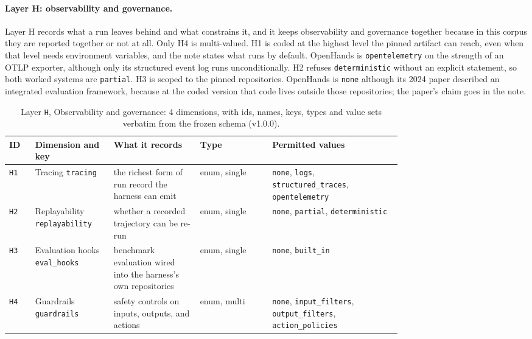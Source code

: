 \paragraph{Layer H: observability and governance.}\label{subsec:layer-h}
Layer H records what a run leaves behind and what constrains it, and it keeps observability and
governance together because in this corpus they are reported together or not at all. Only H4 is
multi-valued. H1 is coded at the highest level the pinned artifact can reach, even when that level needs
environment variables, and the note states what runs by default. OpenHands is \texttt{opentelemetry} on
the strength of an OTLP exporter, although only its structured event log runs unconditionally. H2
refuses \texttt{deterministic} without an explicit statement, so both worked systems are
\texttt{partial}. H3 is scoped to the pinned repositories. OpenHands is \texttt{none} although its 2024
paper described an integrated evaluation framework, because at the coded version that code lives outside
those repositories; the paper's claim goes in the note.

\begin{table}[htbp]
\caption{Layer \texttt{H}, Observability and governance: 4 dimensions, with ids, names, keys, types and value
sets verbatim from the frozen schema (v1.0.0).}
\label{tab:coding-H}
\footnotesize
\begin{tabular}{@{}l p{0.20\linewidth} p{0.22\linewidth} l p{0.33\linewidth}@{}}
\toprule
ID & Dimension and key & What it records & Type & Permitted values \tabularnewline
\midrule
\texttt{H1} & \raggedright Tracing \newline \texttt{tracing} & \raggedright the richest form of run record the harness can emit & enum, single & \raggedright \texttt{none}, \texttt{logs}, \texttt{structured\_traces}, \texttt{opentelemetry} \tabularnewline
\texttt{H2} & \raggedright Replayability \newline \texttt{replayability} & \raggedright whether a recorded trajectory can be re-run & enum, single & \raggedright \texttt{none}, \texttt{partial}, \texttt{deterministic} \tabularnewline
\texttt{H3} & \raggedright Evaluation hooks \newline \texttt{eval\_hooks} & \raggedright benchmark evaluation wired into the harness's own repositories & enum, single & \raggedright \texttt{none}, \texttt{built\_in} \tabularnewline
\texttt{H4} & \raggedright Guardrails \newline \texttt{guardrails} & \raggedright safety controls on inputs, outputs, and actions & enum, multi & \raggedright \texttt{none}, \texttt{input\_filters}, \texttt{output\_filters}, \texttt{action\_policies} \tabularnewline
\bottomrule
\end{tabular}
\end{table}

